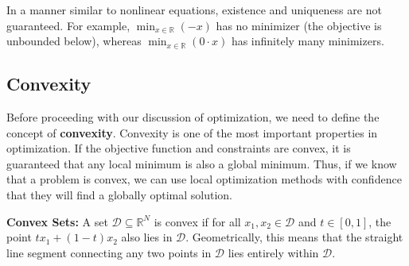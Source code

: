 In a manner similar to nonlinear equations, existence and uniqueness are not guaranteed. For example, $\min_{x \in \mathbb{R}} (-x)$ has no minimizer (the objective is unbounded below), whereas $\min_{x \in \mathbb{R}} (0\cdot x)$ has infinitely many minimizers.

\subsection{Convexity}
\label{sec:convexity}
Before proceeding with our discussion of optimization, we need to define the concept of \textbf{convexity}. Convexity is one of the most important properties in optimization.
If the objective function and constraints are convex, it is guaranteed that any local minimum is also a global minimum.
Thus, if we know that a problem is convex, we can use local optimization methods with confidence that they will find a globally optimal solution.

\textbf{Convex Sets:}
A set $\mathcal{D} \subseteq \mathbb{R}^N$ is convex if for all $x_1,x_2 \in \mathcal{D}$ and $t\in[0,1]$, the point $t x_1 + (1-t) x_2$ also lies in $\mathcal{D}$. Geometrically, this means that the straight line segment connecting any two points in $\mathcal{D}$ lies entirely within $\mathcal{D}$.

